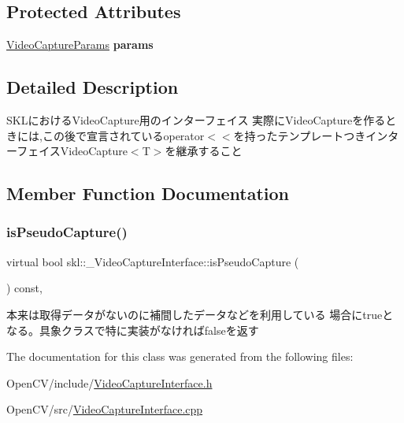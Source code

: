\subsection*{Protected Attributes}
\begin{DoxyCompactItemize}
\item 
\hypertarget{classskl_1_1___video_capture_interface_ad1732916c33a970c2a5c0fa12698f4ab}{}\label{classskl_1_1___video_capture_interface_ad1732916c33a970c2a5c0fa12698f4ab} 
\hyperlink{classskl_1_1_video_capture_params}{Video\+Capture\+Params} {\bfseries params}
\end{DoxyCompactItemize}


\subsection{Detailed Description}
S\+K\+Lにおける\+Video\+Capture用のインターフェイス  実際に\+Video\+Captureを作るときには,この後で宣言されているoperator$<$$<$を持ったテンプレートつきインターフェイス\+Video\+Capture$<$\+T$>$を継承すること 

\subsection{Member Function Documentation}
\hypertarget{classskl_1_1___video_capture_interface_acf6bb54ae5d4bcee82029b36c8ae17bf}{}\label{classskl_1_1___video_capture_interface_acf6bb54ae5d4bcee82029b36c8ae17bf} 
\subsubsection{\texorpdfstring{is\+Pseudo\+Capture()}{isPseudoCapture()}}
{\footnotesize\ttfamily virtual bool skl\+::\+\_\+\+Video\+Capture\+Interface\+::is\+Pseudo\+Capture (\begin{DoxyParamCaption}{ }\end{DoxyParamCaption}) const\hspace{0.3cm}{\ttfamily [inline]}, {\ttfamily [virtual]}}

本来は取得データがないのに補間したデータなどを利用している 場合にtrueとなる。具象クラスで特に実装がなければfalseを返す 

The documentation for this class was generated from the following files\+:\begin{DoxyCompactItemize}
\item 
Open\+C\+V/include/\hyperlink{_video_capture_interface_8h}{Video\+Capture\+Interface.\+h}\item 
Open\+C\+V/src/\hyperlink{_video_capture_interface_8cpp}{Video\+Capture\+Interface.\+cpp}\end{DoxyCompactItemize}
